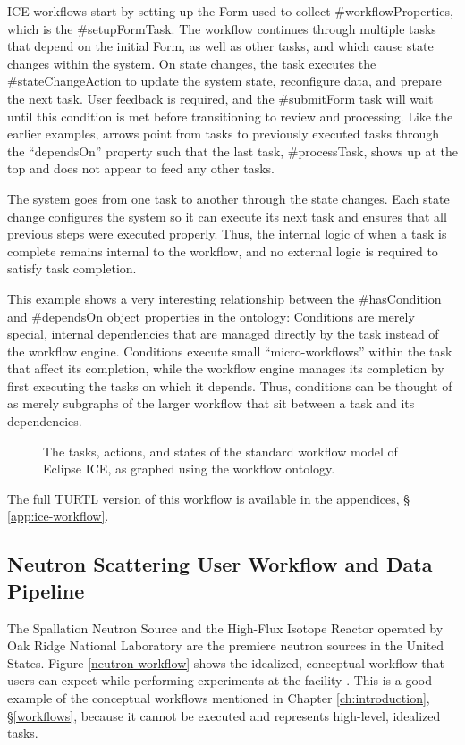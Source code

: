 ICE workflows start by setting up the Form used to collect
\#workflowProperties, which is the \#setupFormTask. The workflow continues
through multiple tasks that depend on the initial Form, as well as other tasks,
and which cause state changes within the system. On state changes, the task
executes the \#stateChangeAction to update the system state, reconfigure data,
and prepare the next task. User feedback is required, and the \#submitForm task
will wait until this condition is met before transitioning to review and
processing. Like the earlier examples, arrows point from tasks to previously
executed tasks through the ``dependsOn'' property such that the last task,
\#processTask, shows up at the top and does not appear to feed any other tasks.

The system goes from one task to another through the state changes. Each state
change configures the system so it can execute its next task and ensures
that all previous steps were executed properly. Thus, the internal logic of when
a task is complete remains internal to the workflow, and no external logic is
required to satisfy task completion.

This example shows a very interesting relationship between the \#hasCondition
and \#dependsOn object properties in the ontology: Conditions are merely
special, internal dependencies that are managed directly by the task instead of the
workflow engine. Conditions execute small ``micro-workflows'' within the task
that affect its completion, while the workflow engine manages its completion by
first executing the tasks on which it depends. Thus, conditions can be thought
of as merely subgraphs of the larger workflow that sit between a task and its
dependencies.

\begin{figure}[htbp]
\centering
{}
\caption{The tasks, actions, and states of the standard workflow model of
Eclipse ICE, as graphed using the workflow ontology.}
\label{ice-workflow}
\end{figure}

The full TURTL version of this workflow is available in the appendices, \S
\ref{app:ice-workflow}.

\subsection{Neutron Scattering User Workflow and Data Pipeline}

The Spallation Neutron Source and the High-Flux Isotope Reactor operated by Oak
Ridge National Laboratory are the premiere neutron sources in the United States.
Figure \ref{neutron-workflow} shows the idealized, conceptual workflow that
users can expect while performing experiments at the facility
\cite{sns-hfir-data-review}. This is a good example of the conceptual
workflows mentioned in Chapter \ref{ch:introduction}, \S \ref{workflows},
because it cannot be executed and represents high-level, idealized tasks.

